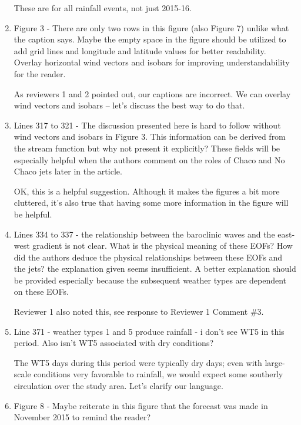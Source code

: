 \documentclass{article}
\newenvironment{answer}{\begin{mdframed}}{\end{mdframed}}
\begin{document}
\begin{enumerate}
\begin{answer}
		These are for all rainfall events, not just 2015-16.
	\end{answer}
	\item Figure 3 - There are only two rows in this figure (also Figure 7) unlike what the caption says. Maybe the empty space in the figure should be utilized to add grid lines and longitude and latitude values for better readability. Overlay horizontal wind vectors and isobars for improving understandability for the reader.
	\begin{answer}
		As reviewers 1 and 2 pointed out, our captions are incorrect.
		We can overlay wind vectors and isobars -- let's discuss the best way to do that.
	\end{answer}
	\item Lines 317 to 321 - The discussion presented here is hard to follow without wind vectors and isobars in Figure 3. This information can be derived from the stream function but why not present it explicitly? These fields will be especially helpful when the authors comment on the roles of Chaco and No Chaco jets later in the article.
	\begin{answer}
		OK, this is a helpful suggestion.
		Although it makes the figures a bit more cluttered, it's also true that having some more information in the figure will be helpful.
	\end{answer}
	\item Lines 334 to 337 - the relationship between the baroclinic waves and the east-west gradient is not clear. What is the physical meaning of these EOFs? How did the authors deduce the physical relationships between these EOFs and the jets? the explanation given seems insufficient. A better explanation should be provided especially because the subsequent weather types are dependent on these EOFs.
	\begin{answer}
		Reviewer 1 also noted this, see response to Reviewer 1 Comment \#3.
	\end{answer}
	\item Line 371 - weather types 1 and 5 produce rainfall - i don't see WT5 in this period. Also isn't WT5 associated with dry conditions?
	\begin{answer}
		The WT5 days during this period were typically dry days; even with large-scale conditions very favorable to rainfall, we would expect some southerly circulation over the study area.
		Let's clarify our language.
	\end{answer}
	\item Figure 8 - Maybe reiterate in this figure that the forecast was made in November 2015 to remind the reader?

\end{enumerate}
\end{document}
